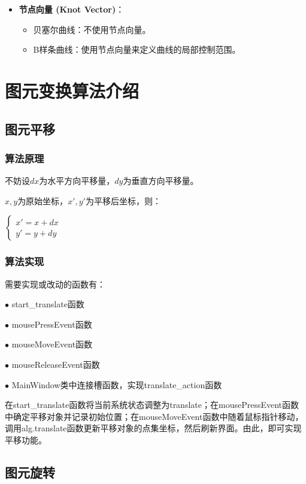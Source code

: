 \documentclass[a4paper,UTF8]{article}
\theoremstyle{definition}
\begin{document}
\begin{itemize}
	\item \textbf{节点向量 (Knot Vector)}：
	\begin{itemize}
		\item 贝塞尔曲线：不使用节点向量。
		\item B样条曲线：使用节点向量来定义曲线的局部控制范围。
	\end{itemize}
\end{itemize}

\section{图元变换算法介绍}

\subsection{图元平移}

\subsubsection{算法原理}

不妨设$dx$为水平方向平移量，$dy$为垂直方向平移量。

$x,y$为原始坐标，$x',y'$为平移后坐标，则：

\begin{center}
$
	\begin{cases}  
		x'=x+dx\\
		y'=y+dy    
	\end{cases} 
$
\end{center}

\subsubsection{算法实现}

需要实现或改动的函数有：

$\bullet$ start\_translate函数

$\bullet$ mousePressEvent函数

$\bullet$ mouseMoveEvent函数

$\bullet$ mouseReleaseEvent函数

$\bullet$ MainWindow类中连接槽函数，实现translate\_action函数

在start\_translate函数将当前系统状态调整为translate；在mousePressEvent函数中确定平移对象并记录初始位置；在mouseMoveEvent函数中随着鼠标指针移动，调用alg.translate函数更新平移对象的点集坐标，然后刷新界面。由此，即可实现平移功能。

\subsection{图元旋转}
\end{document}
